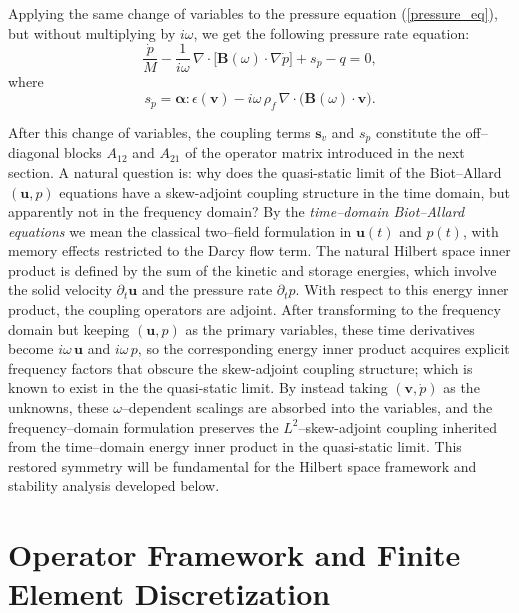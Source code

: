 \documentclass[pdflatex,sn-mathphys-num]{sn-jnl}
\theoremstyle{thmstyleone}%
\theoremstyle{thmstyletwo}%
\theoremstyle{thmstylethree}%
\theoremstyle{definition}
\begin{document}
	
	Applying the same change of variables to the pressure equation (\ref{pressure_eq}), but without multiplying by $i\omega $, we get the following pressure rate equation: 
	\begin{equation}
		\frac{\dot{p}}{M} - \frac{1}{i\omega}\,\nabla\cdot\big[\mathbf{B}(\omega)\cdot\nabla\dot{p}\big] + s_{\dot{p}} - q = 0,
		\label{eq:vpr_pressure}
	\end{equation}
	where
	\begin{equation*}
		s_{\dot{p}} = \boldsymbol{\alpha}:\epsilon(\mathbf{v}) - i\omega\,\rho_f\,\nabla\cdot\big(\mathbf{B}(\omega)\cdot\mathbf{v}\big).
	\end{equation*}
	
	After this change of variables, the coupling terms 
	$\mathbf{s}_v$ and $s_{\dot{p}}$ constitute the off--diagonal 
	blocks $A_{12}$ and $A_{21}$ of the operator matrix introduced 
	in the next section. 
	A natural question is: why does the quasi-static limit of the Biot--Allard $(\mathbf{u},p)$ 
	equations have a skew-adjoint coupling structure in the time domain, but apparently not in the frequency domain? 
	By the \emph{time--domain Biot--Allard equations} we mean the classical 
	two--field formulation in $\mathbf{u}(t)$ and $p(t)$, with memory 
	effects restricted to the Darcy flow term. 
	The natural Hilbert space inner product is defined by the sum of the 
	kinetic and storage energies, which involve the solid velocity 
	$\partial_t \mathbf{u}$ and the pressure rate $\partial_t p$. 
	With respect to this energy inner product, the coupling operators are 
	adjoint. 
	After transforming to the frequency domain but keeping 
	$(\mathbf{u},p)$ as the primary variables, these time derivatives 
	become $i\omega\,\mathbf{u}$ and $i\omega\,p$, so the corresponding 
	energy inner product acquires explicit frequency factors that obscure 
	the skew-adjoint coupling structure; which is known to exist in the the quasi-static limit.
	By instead taking $(\mathbf{v},\dot{p})$ as the unknowns, these 
	$\omega$--dependent scalings are absorbed into the variables, and the 
	frequency--domain formulation preserves the $L^{2}$--skew-adjoint coupling 
	inherited from the time--domain energy inner product in the quasi-static limit. 
	This restored symmetry will be fundamental for the Hilbert space 
	framework and stability analysis developed below.
	
	

	
	\section{Operator Framework and Finite Element Discretization}
	\label{sec:operator-weak}
	
\end{document}

